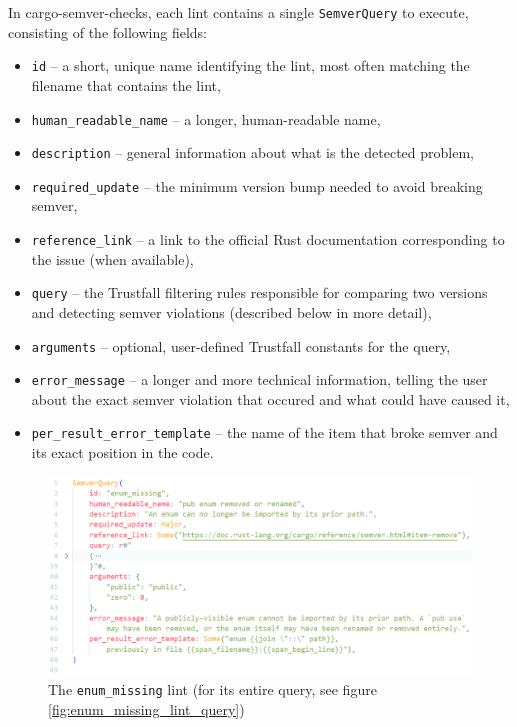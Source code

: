 \documentclass[licencjacka,en]{pracamgr}
\begin{document}
In cargo-semver-checks, each lint contains a single \texttt{SemverQuery} to execute, consisting of
the following fields:

\begin{itemize}
	\item \texttt{id} -- a short, unique name identifying the lint, most often matching the
		filename that contains the lint,
	\item \texttt{human\_readable\_name} -- a longer, human-readable name,
	\item \texttt{description} -- general information about what is the detected problem,
	\item \texttt{required\_update} -- the minimum version bump needed to avoid breaking semver,
	\item \texttt{reference\_link} -- a link to the official Rust documentation corresponding to
		the issue (when available),
	\item \texttt{query} -- the Trustfall filtering rules responsible for comparing two versions and
		detecting semver violations (described below in more detail),
	\item \texttt{arguments} -- optional, user-defined Trustfall constants for the query,
	\item \texttt{error\_message} -- a longer and more technical information, telling the user
	    about the exact semver violation that occured and what could have caused it,
	\item \texttt{per\_result\_error\_template} -- the name of the item that broke semver and
	    its exact position in the code.
\end{itemize}

\begin{figure}[h]
	\centering
	\includegraphics[width=\linewidth]{lint-example.png}
	\caption{The \texttt{enum\_missing} lint (for its entire query, see figure
		\ref{fig:enum_missing_lint_query})}
	\label{fig:enum_missing_lint}
\end{figure}
\end{document}
